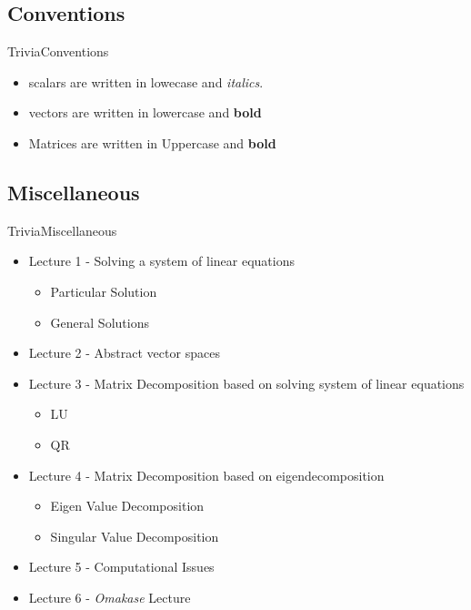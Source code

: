 \documentclass[10pt]{beamer}
\begin{document}
\subsection{Conventions}
\begin{frame}{Trivia}{Conventions}
  \begin{itemize}
    \item scalars are written in lowecase and \textit{italics}.
    \item vectors are written in lowercase and \textbf{bold}
    \item Matrices are written in Uppercase and \textbf{bold}
  \end{itemize}
\end{frame}



\subsection{Miscellaneous}
\begin{frame}{Trivia}{Miscellaneous}
  \begin{itemize}
  \item Lecture 1 - Solving a system of linear equations
  \begin{itemize}
  \item Particular Solution
  \item General Solutions
  \end{itemize}
  \item Lecture 2 - Abstract vector spaces 
  \item Lecture 3 - Matrix Decomposition based on solving system of linear equations  
  \begin{itemize}
  \item LU
  \item QR
  \end{itemize}
  \item Lecture 4 - Matrix Decomposition based on eigendecomposition 
  \begin{itemize}
  \item Eigen Value Decomposition
  \item Singular Value Decomposition
  \end{itemize}
  \item Lecture 5 - Computational Issues
  \item Lecture 6 - \textit{Omakase} Lecture
  \end{itemize}
\end{frame}
\end{document}

